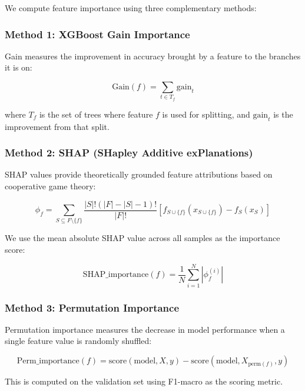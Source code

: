 \documentclass[11pt,a4paper]{article}
\begin{document}
We compute feature importance using three complementary methods:

\subsubsection{Method 1: XGBoost Gain Importance}

Gain measures the improvement in accuracy brought by a feature to the branches it is on:

\begin{equation}
  \text{Gain}(f) = \sum_{t \in T_f} \text{gain}_t
\end{equation}

where $T_f$ is the set of trees where feature $f$ is used for splitting, and $\text{gain}_t$ is the improvement from that split.

\subsubsection{Method 2: SHAP (SHapley Additive exPlanations)}

SHAP values provide theoretically grounded feature attributions based on cooperative game theory:

\begin{equation}
  \phi_f = \sum_{S \subseteq F \setminus \{f\}} \frac{|S|!(|F|-|S|-1)!}{|F|!} \left[ f_{S \cup \{f\}}(x_{S \cup \{f\}}) - f_S(x_S) \right]
\end{equation}

We use the mean absolute SHAP value across all samples as the importance score:

\begin{equation}
  \text{SHAP\_importance}(f) = \frac{1}{N} \sum_{i=1}^N |\phi_f^{(i)}|
\end{equation}

\subsubsection{Method 3: Permutation Importance}

Permutation importance measures the decrease in model performance when a single feature value is randomly shuffled:

\begin{equation}
  \text{Perm\_importance}(f) = \text{score}(\text{model}, X, y) - \text{score}(\text{model}, X_{\text{perm}(f)}, y)
\end{equation}

This is computed on the validation set using F1-macro as the scoring metric.
\end{document}
